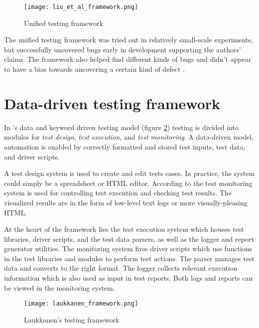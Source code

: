 \documentclass[12pt,a4paper,oneside,pdftex]{report}
\begin{document}
\begin{figure}[H]
  \begin{center}
    \texttt{[image: liu\_et\_al\_framework.png]}
    \caption{Unified testing framework \citep{liu2009unified}}
    \label{fig:liu}
  \end{center}
\end{figure}

The unified testing framework was tried out in relatively small-scale experiments, but successfully uncovered bugs early in development supporting the authors' claims. The framework also helped find different kinds of bugs and didn't appear to have a bias towards uncovering a certain kind of defect \citep{liu2009unified}.

\section{Data-driven testing framework}

In \citeauthor{laukkanen2006data}'s \citeyearpar{laukkanen2006data} data and keyword driven testing model (figure \ref{fig:laukkanen}) testing is divided into modules for \emph{test design}, \emph{test execution}, and \emph{test monitoring}. A data-driven model, automation is enabled by correctly formatted and stored test inputs, test data, and driver scripts.

A test design system is used to create and edit tests cases. In practice, the system could simply be a spreadsheet or HTML editor. According to \citet{laukkanen2006data} the test monitoring system is used for controlling test execution and checking test results. The visualized results are in the form of low-level text logs or more visually-pleasing HTML.

At the heart of the framework lies the test execution system which houses test libraries, driver scripts, and the test data parsers, as well as the logger and report generator utilities. The monitoring system fires driver scripts which use functions in the test libraries and modules to perform test actions. The parser manages test data and converts to the right format. The logger collects relevant execution information which is also used as input in test reports. Both logs and reports can be viewed in the monitoring system. \citep{laukkanen2006data}

\begin{figure}[H]
  \begin{center}
    \texttt{[image: laukkanen\_framework.png]}
    \caption{Laukkanen's testing framework \citep{laukkanen2006data}}
    \label{fig:laukkanen} 
  \end{center}
\end{figure}
\end{document}
